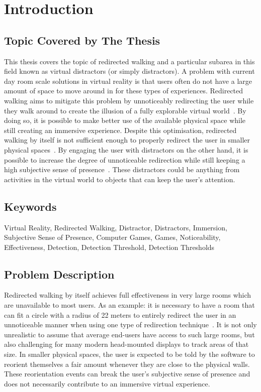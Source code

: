 \chapter{Introduction}
\label{chap:introduction}

\section{Topic Covered by The Thesis}
This thesis covers the topic of redirected walking and a particular subarea in this field known as virtual distractors (or simply distractors). A problem with current day room scale solutions in virtual reality is that users often do not have a large amount of space to move around in for these types of experiences. Redirected walking aims to mitigate this problem by unnoticeably redirecting the user while they walk around to create the illusion of a fully explorable virtual world~\cite{razzaque2001redirected}. By doing so, it is possible to make better use of the available physical space while still creating an immersive experience. Despite this optimisation, redirected walking by itself is not sufficient enough to properly redirect the user in smaller physical spaces~\cite{5072212,azmandian2015physical}. By engaging the user with distractors on the other hand, it is possible to increase the degree of unnoticeable redirection while still keeping a high subjective sense of presence~\cite{peck2009evaluation}. These distractors could be anything from activities in the virtual world to objects that can keep the user's attention.  


\section{Keywords}
Virtual Reality, Redirected Walking, Distractor, Distractors, Immersion, Subjective Sense of Presence, Computer Games, Games, Noticeability, Effectiveness, Detection, Detection Threshold, Detection Thresholds

\section{Problem Description}
Redirected walking by itself achieves full effectiveness in very large rooms which are unavailable to most users. As an example: it is necessary to have a room that can fit a circle with a radius of 22 meters to entirely redirect the user in an unnoticeable manner when using one type of redirection technique~\cite{5072212, azmandian2015physical}. It is not only unrealistic to assume that average end-users have access to such large rooms, but also challenging for many modern head-mounted displays to track areas of that size. In smaller physical spaces, the user is expected to be told by the software to reorient themselves a fair amount whenever they are close to the physical walls. These reorientation events can break the user's subjective sense of presence and does not necessarily contribute to an immersive virtual experience. 


